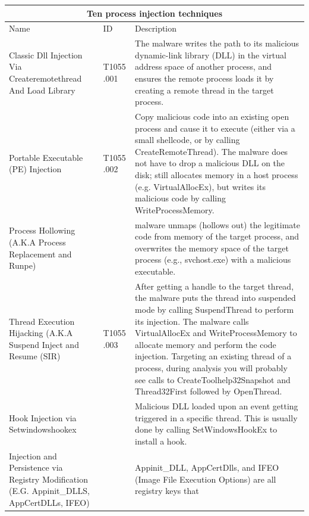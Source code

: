 \documentclass{article}
\begin{document}
\begin{table}[h!]
\centering
\begin{tabular}{ |p{3.5cm}||p{1.2cm}|p{10cm}|  }
  \hline
  \multicolumn{3}{|c|}{Ten process injection techniques} \\
  \hline
  Name	& ID & Description \\
  \hline
  Classic Dll Injection Via Createremotethread And Load Library
        & T1055 .001
             & The malware writes the path to its malicious dynamic-link
               library (DLL) in the virtual address space of another process,
               and ensures the remote process loads it by creating a remote thread in the target process. \\
  \hline
  Portable Executable (PE) Injection
        & T1055 .002
             & Copy malicious code into an existing open process and cause it to execute (either via a
               small shellcode, or by calling CreateRemoteThread). The malware does not have to drop a
               malicious DLL on the disk; still allocates memory in a host process (e.g. VirtualAllocEx),
               but writes its malicious code by calling WriteProcessMemory. \\
  \hline
  Process Hollowing (A.K.A Process Replacement and Runpe)
        &
             & malware unmaps (hollows out) the legitimate code from memory of the target process, and
               overwrites the memory space of the target process (e.g., svchost.exe) with a malicious executable.\\
  \hline
  Thread Execution Hijacking (A.K.A Suspend Inject and Resume (SIR)
        & T1055 .003
             & After getting a handle to the target thread, the malware puts the thread into suspended mode by
               calling SuspendThread to perform its injection. The malware calls VirtualAllocEx and
               WriteProcessMemory to allocate memory and perform the code injection. Targeting an existing thread
               of a process, during analysis you will probably see calls to CreateToolhelp32Snapshot and
               Thread32First followed by OpenThread. \\
  \hline
  Hook Injection via Setwindowshookex
        &
             & Malicious DLL loaded upon an event getting triggered in a specific thread. This is usually
               done by calling SetWindowsHookEx to install a hook. \\
  \hline
  Injection and Persistence via Registry Modification (E.G. Appinit\_DLLS, AppCertDLLs, IFEO)
        &
             & Appinit\_DLL, AppCertDlls, and IFEO (Image File Execution Options) are all registry keys that

\end{tabular}
\end{table}
\end{document}
